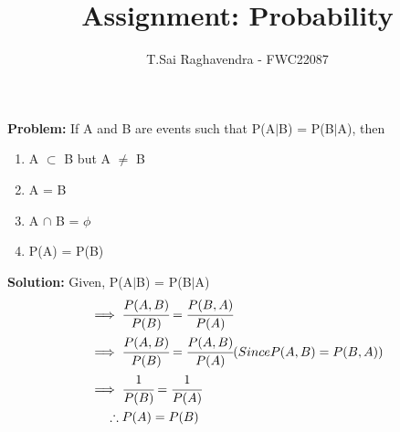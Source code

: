 \documentclass{article}
\newcommand{\Problem}{\noindent \textbf{Problem: }}
\newcommand{\solution}{\noindent \textbf{Solution: }}
\begin{document}
\title{Assignment: Probability}
\author{\Large T.Sai Raghavendra - FWC22087}
\date{}


\maketitle

\Problem If A and B are events such that P(A$|$B) = P(B$|$A), then\\
\begin{enumerate}
\item A $\subset$ B but A $\not=$ B
\item A = B
\item A $\cap$ B = $\phi$
\item P(A) = P(B)
\end{enumerate}

\solution
Given, P(A$|$B) = P(B$|$A)
\begin{align*}
\implies& \; \cfrac{P(A,B)}{P(B)} = \cfrac{P(B,A)}{P(A)}\\ 
\implies& \; \cfrac{P(A,B)}{P(B)} = \cfrac{P(A,B)}{P(A)} (Since P(A,B) = P(B,A))\\
\implies& \; \cfrac{1}{P(B)} = \cfrac{1}{P(A)}\\
\therefore& \; P(A) = P(B)
\end{align*}
\end{document}
